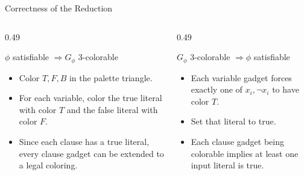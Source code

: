 \documentclass[aspectratio=43,8pt]{beamer}
\begin{document}
\begin{frame}{Correctness of the Reduction}
\begin{columns}[T]
\begin{column}{0.49\textwidth}
\begin{block}{$\phi$ satisfiable $\Rightarrow G_\phi$ 3-colorable}
\begin{itemize}
    \item Color $T,F,B$ in the palette triangle.
    \item For each variable, color the true literal with color $T$ and the false literal with color $F$.
    \item Since each clause has a true literal, every clause gadget can be extended to a legal coloring.
\end{itemize}
\end{block}
\end{column}
\begin{column}{0.49\textwidth}
\begin{block}{$G_\phi$ 3-colorable $\Rightarrow \phi$ satisfiable}
\begin{itemize}
    \item Each variable gadget forces exactly one of $x_i,\neg x_i$ to have color $T$.
    \item Set that literal to true.
    \item Each clause gadget being colorable implies at least one input literal is true.
\end{itemize}
\end{block}
\end{column}
\end{columns}
\vspace{0.2cm}
\begin{center}
\end{center}
\end{frame}
\end{document}
